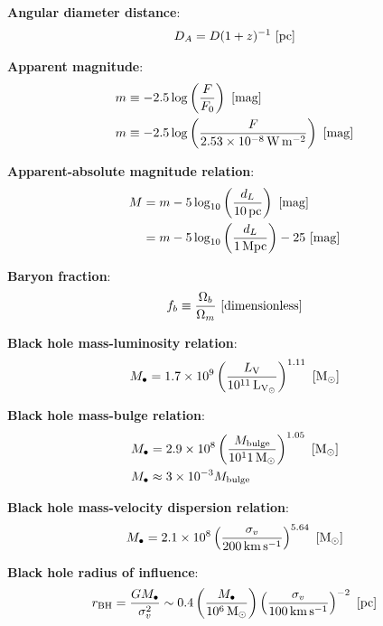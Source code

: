\documentclass[a4paper,11pt]{article}
\begin{document}
{\noindent}\textbf{Angular diameter distance}:
\begin{align*}
    D_A = D(1+z)^{-1} ~ [{\rm pc}]
\end{align*}

{\noindent}\textbf{Apparent magnitude}:
\begin{align*}
     m &\equiv -2.5\log\left(\frac{F}{F_0}\right) ~ [{\rm mag}] \\
     m &\equiv -2.5\log\left(\frac{F}{2.53\times10^{-8}\,{\rm W\,m^{-2}}}\right) ~ [{\rm mag}]
\end{align*}

{\noindent}\textbf{Apparent-absolute magnitude relation}:
\begin{align*}
    M &= m -5\log_{10}\left(\frac{d_L}{10\,{\rm pc}}\right) ~ [{\rm mag}] \\
      &= m -5\log_{10}\left(\frac{d_L}{1\,{\rm Mpc}}\right)-25 ~ [{\rm mag}]
\end{align*}

{\noindent}\textbf{Baryon fraction}:
\begin{align*}
    f_b \equiv \frac{\Omega_b}{\Omega_m} ~ [{\rm dimensionless}]
\end{align*}

{\noindent}\textbf{Black hole mass-luminosity relation}:
\begin{align*}
    M_\bullet = 1.7\times10^9\left(\frac{L_\mathrm{V}}{10^{11}\,{\rm L_{V_\odot}}}\right)^{1.11} ~ [{\rm M_\odot}]
\end{align*}

{\noindent}\textbf{Black hole mass-bulge relation}:
\begin{align*}
    M_\bullet &= 2.9\times10^8\left(\frac{M_\mathrm{bulge}}{10^11\,{\rm M_\odot}}\right)^{1.05} ~ [{\rm M_\odot}] \\
    M_\bullet &\approx 3\times10^{-3}M_\mathrm{bulge}
\end{align*}

{\noindent}\textbf{Black hole mass-velocity dispersion relation}:
\begin{align*}
    M_\bullet = 2.1\times 10^8\left(\frac{\sigma_v}{200\,{\rm km\,s^{-1}}}\right)^{5.64} ~ [{\rm M_\odot}]
\end{align*}

{\noindent}\textbf{Black hole radius of influence}:
\begin{align*}
    r_\mathrm{BH} = \frac{GM_\bullet}{\sigma_v^2} \sim 0.4\left(\frac{M_\bullet}{10^6\,{\rm M_\odot}}\right)\left(\frac{\sigma_v}{100\,{\rm km\,s^{-1}}}\right)^{-2} ~ [{\rm pc}]
\end{align*}
\end{document}
